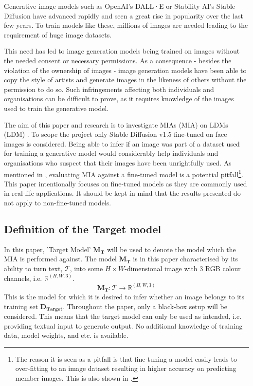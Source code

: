 Generative image models such as OpenAI's DALL·E or Stability AI's Stable Diffusion have advanced rapidly and seen a great rise in popularity over the last few years. To train models like these, millions of images are needed leading to the requirement of huge image datasets. 

This need has led to image generation models being trained on images without the needed consent or necessary permissions. As a consequence - besides the violation of the ownership of images - image generation models have been able to copy the style of artists and generate images in the likeness of others without the permission to do so. Such infringements affecting both individuals and organisations can be difficult to prove, as it requires knowledge of the images used to train the generative model.

The aim of this paper and research is to investigate \acrlong{MIA}s (MIA) on \acrlong{LDM}s (LDM) \cite{rombach2022highresolution}. To scope the project only Stable Diffusion v1.5 \cite{rombach2022highresolution} fine-tuned on face images is considered. Being able to infer if an image was part of a dataset used for training a generative model would considerably help individuals and organisations who suspect that their images have been unrightfully used. As mentioned in \cite{Dubinski2023TowardsMR}, evaluating MIA against a fine-tuned model is a potential pitfall\footnote{The reason it is seen as a pitfall is that fine-tuning a model easily leads to over-fitting to an image dataset resulting in higher accuracy on predicting member images. This is also shown in \cite{Carlini2023ExtractingTD}.}. This paper intentionally focuses on fine-tuned models as they are commonly used in real-life applications. It should be kept in mind that the results presented do not apply to non-fine-tuned models. 

\subsection{Definition of the Target model} \label{sec:intro_def_target_model}
In this paper, 'Target Model' $\mathbf{M_T}$  will be used to denote the model which the MIA is performed against. The model $\mathbf{M_T}$ is in this paper characterised by its ability to turn text, $\mathcal{T}$, into some $H\times W$-dimensional image with 3 RGB colour channels, i.e. $\mathbb{R}^{(H,W,3)}$.
\begin{equation}
    \mathbf{M_T} : \mathcal{T} \rightarrow \mathbb{R}^{(H,W,3)}
\end{equation}
This is the model for which it is desired to infer whether an image belongs to its training set $\mathbf{D_{Target}}$. Throughout the paper, only a black-box setup will be considered. This means that the target model can only be used as intended, i.e. providing textual input to generate output. No additional knowledge of training data, model weights, and etc. is available.

